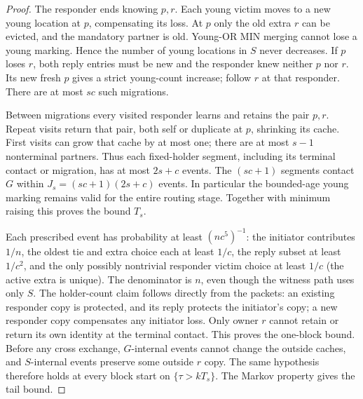 \documentclass[11pt]{article}
\begin{document}
\begin{proof}
The responder ends knowing $p,r$. Each young victim moves to a
new young location at $p$, compensating its loss. At $p$ only the
old extra $r$ can be evicted, and the mandatory partner is old.
Young-OR MIN merging cannot lose a young marking. Hence the number
of young locations in $S$ never decreases. If $p$ loses $r$, both
reply entries must be new and the responder knew neither $p$ nor
$r$. Its new fresh $p$ gives a strict young-count increase; follow
$r$ at that responder. There are at most $sc$ such migrations.

Between migrations every visited responder learns and retains the
pair $p,r$. Repeat visits return that pair, both self or duplicate
at $p$, shrinking its cache. First visits can grow that cache by at
most one; there are at most $s-1$ nonterminal partners. Thus each
fixed-holder segment, including its terminal contact or migration,
has at most $2s+c$ events. The $(sc+1)$ segments contact $G$ within
$J_s=(sc+1)(2s+c)$ events. In particular the bounded-age young
marking remains valid for the entire routing stage.
Together with minimum raising this proves the bound $T_s$.

Each prescribed event has probability at least
$(nc^5)^{-1}$: the initiator contributes $1/n$, the oldest tie
and extra choice each at least $1/c$, the reply subset at least
$1/c^2$, and the only possibly nontrivial responder victim choice
at least $1/c$ (the active extra is unique). The denominator
is $n$, even though the witness path uses only $S$.
The holder-count claim follows directly from the packets:
an existing responder copy is protected, and its reply
protects the initiator's copy; a new responder copy
compensates any initiator loss. Only owner $r$ cannot
retain or return its own identity at the terminal contact.
This proves the one-block bound. Before any cross exchange,
$G$-internal events cannot change the outside caches, and
$S$-internal events preserve some outside $r$ copy.
The same hypothesis therefore holds at every block start
on $\{\tau>kT_s\}$. The Markov property gives the tail bound.
\end{proof}
\end{document}

